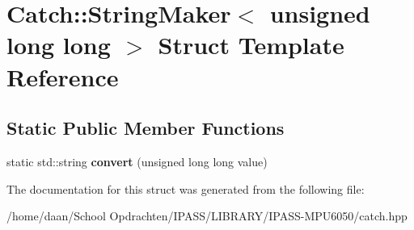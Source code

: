 \hypertarget{structCatch_1_1StringMaker_3_01unsigned_01long_01long_01_4}{}\section{Catch\+:\+:String\+Maker$<$ unsigned long long $>$ Struct Template Reference}
\label{structCatch_1_1StringMaker_3_01unsigned_01long_01long_01_4}
\subsection*{Static Public Member Functions}
\begin{DoxyCompactItemize}
\item 
\mbox{\label{structCatch_1_1StringMaker_3_01unsigned_01long_01long_01_4_a6a8708af4fc8df3f52d7eab779b6bc6f}} 
static std\+::string {\bfseries convert} (unsigned long long value)
\end{DoxyCompactItemize}


The documentation for this struct was generated from the following file\+:\begin{DoxyCompactItemize}
\item 
/home/daan/\+School Opdrachten/\+I\+P\+A\+S\+S/\+L\+I\+B\+R\+A\+R\+Y/\+I\+P\+A\+S\+S-\/\+M\+P\+U6050/catch.\+hpp\end{DoxyCompactItemize}
